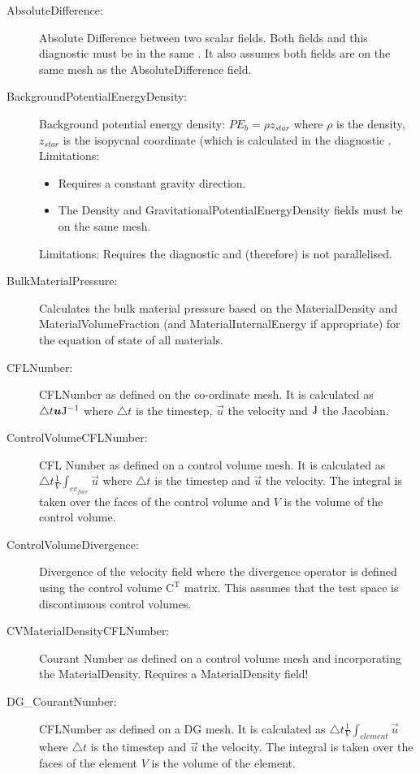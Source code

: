 \begin{description}
\item[AbsoluteDifference:]Absolute Difference between two scalar fields. Both fields and this diagnostic  must be in the same . It also assumes both fields are on the same mesh as the AbsoluteDifference field.  
\item[BackgroundPotentialEnergyDensity:]Background potential energy density: $PE_b = \rho z_{star}$ where $\rho$ is the density, $z_{star}$ is the isopycnal coordinate (which is calculated in the diagnostic . \\Limitations: 
	\begin{itemize}
	\item Requires a constant gravity direction. 
	\item The Density and GravitationalPotentialEnergyDensity fields must be on the same mesh. 
	\end{itemize}
Limitations: Requires the diagnostic  and (therefore) is not parallelised.
\item[BulkMaterialPressure:]Calculates the bulk material pressure based on the MaterialDensity and MaterialVolumeFraction (and MaterialInternalEnergy if appropriate) for the equation of state of all materials.
\item[CFLNumber:]CFLNumber as defined on the co-ordinate mesh. It is calculated as $\triangle t {\mbox{\boldmath$u$}} \mathrm{J}^{-1}$ where $\triangle t$ is the timestep, $\vec{u}$ the velocity and $\mathrm{J}$ the Jacobian. 
\item[ControlVolumeCFLNumber:]CFL Number as defined on a control volume mesh. It is calculated as $\triangle t \frac{1}{V} \int _{cv_{face}} \vec{u}$ where $\triangle t$ is the timestep and $\vec{u}$ the velocity. The integral is taken over the faces of the control volume and $V$ is the volume of the control volume.
\item[ControlVolumeDivergence:]Divergence of the velocity field where the divergence operator is defined using the control volume $\mathrm{C}^\mathrm{T}$ matrix. This assumes that the test space is discontinuous control volumes.
\item[CVMaterialDensityCFLNumber:]Courant Number as defined on a control volume mesh and incorporating the MaterialDensity. Requires a MaterialDensity field!
\item[DG\_CourantNumber:]CFLNumber as defined on a DG mesh. It is calculated as $\triangle t \frac{1}{V} \int _{element} \vec{u}$ where $\triangle t$ is the timestep and $\vec{u}$ the velocity. The integral is taken over the faces of the element $V$ is the volume of the element.

\end{description}
